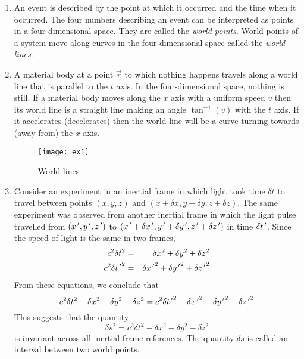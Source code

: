 \begin{enumerate}
\item An event is described by the point at which it occurred and the time when it
occurred. The four numbers describing an event can be interpreted as points in a
four-dimensional space. They are called the \emph{world points}. World points of
a system move along curves in the four-dimensional space called the \emph{world 
lines}.

\item A material body at a point $\vec{r}$ to which nothing happens travels along
a world line that is parallel to the $t$ axis. In the four-dimensional space, nothing
is still. If a material body moves along the $x$ axis with a uniform speed $v$ then
its world line is a straight line making an angle $\tan^{-1}(v)$ with the $t$ axis.
If it accelerates (decelerates) then the world line will be a curve turning towards 
(away from) the $x$-axis. 
\begin{figure}
\texttt{[image: ex1]}
\caption{World lines}
\label{c1f1}
\end{figure}

\item Consider an experiment in an inertial frame in which light took time 
$\delta t$ to travel between points $(x, y, z)$ and $(x + \delta x, y + 
\delta y, z + \delta z)$. The same experiment was observed from another inertial 
frame in which the light pulse travelled from $(x^{\,\prime}, y^{\,\prime}, z^{\,\prime})$ to $(x^{\,\prime} 
+ \delta x^{\,\prime}, y^{\,\prime} + \delta y^{\,\prime}, z^{\,\prime} + \delta z^{\,\prime})$ in time $\delta t^{\,\prime}$.
Since the speed of light is the same in two frames,
\begin{eqnarray}
c^2\delta t^2 &=& \delta x^2 + \delta y^2 + \delta z^2 \label{c1e2} \\
c^2\delta {t^{\,\prime}}^2 &=& \delta {x^{\,\prime}}^2 + \delta {y^{\,\prime}}^2 + \delta {z^{\,\prime}}^2 \label{c1e3}
\end{eqnarray}
From these equations, we conclude that
\begin{equation}\label{c1e4}
c^2\delta t^2 - \delta x^2 - \delta y^2 - \delta z^2 = 
c^2\delta {t^{\,\prime}}^2 - \delta {x^{\,\prime}}^2 - \delta {y^{\,\prime}}^2 - \delta {z^{\,\prime}}^2
\end{equation}
This suggests that the quantity 
\begin{equation}\label{c1e5}
\delta s^2 = c^2\delta t^2 - \delta x^2 - \delta y^2 - \delta z^2
\end{equation}
is invariant across all inertial frame references. The quantity $\delta s$ is
called an interval between two world points.


\end{enumerate}
